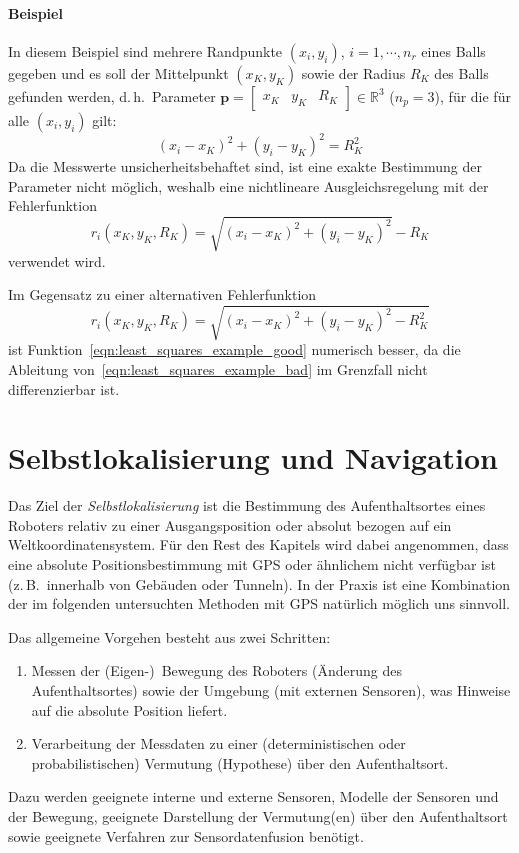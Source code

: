 \documentclass[a4paper, 11pt, accentcolor = tud3b]{tudreport}
\newcommand{\R}{\mathbb{R}}
\renewcommand{\vec}[1]{\boldsymbol{#1}}
\renewcommand{\dh}{d.\,h.~}
\newcommand{\zB}{z.\,B.~}
\begin{document}
				\paragraph{Beispiel}
					In diesem Beispiel sind mehrere Randpunkte \( (x_i, y_i) \), \( i = 1, \cdots, n_r \) eines Balls gegeben und es soll der Mittelpunkt \( (x_K, y_K) \) sowie der Radius \( R_K \) des Balls gefunden werden, \dh Parameter \( \vec{p} = \begin{bmatrix} x_K & y_K & R_K \end{bmatrix} \in \R^3 \) (\( n_p = 3 \)), für die für alle \( (x_i, y_i) \) gilt:
					\begin{equation*}
						(x_i - x_K)^2 + (y_i - y_K)^2 = R_K^2 \tag{Kreisgleichung}
					\end{equation*}
					Da die Messwerte unsicherheitsbehaftet sind, ist eine exakte Bestimmung der Parameter nicht möglich, weshalb eine nichtlineare Ausgleichsregelung mit der Fehlerfunktion
					\begin{equation}
						r_i(x_K, y_K, R_K) = \sqrt{(x_i - x_K)^2 + (y_i - y_K)^2} - R_K \label{eqn:least_squares_example_good}
					\end{equation}
					verwendet wird.
					
					Im Gegensatz zu einer alternativen Fehlerfunktion
					\begin{equation}
						r_i(x_K, y_K, R_K) = \sqrt{(x_i - x_K)^2 + (y_i - y_K)^2 - R_K^2} \label{eqn:least_squares_example_bad}
					\end{equation}
					ist Funktion~\ref{eqn:least_squares_example_good} numerisch besser, da die Ableitung von~\ref{eqn:least_squares_example_bad} im Grenzfall nicht differenzierbar ist.

		\section{Selbstlokalisierung und Navigation}
			Das Ziel der \emph{Selbstlokalisierung} ist die Bestimmung des Aufenthaltsortes eines Roboters relativ zu einer Ausgangsposition oder absolut bezogen auf ein Weltkoordinatensystem. Für den Rest des Kapitels wird dabei angenommen, dass eine absolute Positionsbestimmung mit GPS oder ähnlichem nicht verfügbar ist (\zB innerhalb von Gebäuden oder Tunneln). In der Praxis ist eine Kombination der im folgenden untersuchten Methoden mit GPS natürlich möglich uns sinnvoll.
			
			Das allgemeine Vorgehen besteht aus zwei Schritten:
			\begin{enumerate}
				\item Messen der (Eigen-)~Bewegung des Roboters (Änderung des Aufenthaltsortes) sowie der Umgebung (mit externen Sensoren), was Hinweise auf die absolute Position liefert.
				\item Verarbeitung der Messdaten zu einer (deterministischen oder probabilistischen) Vermutung (Hypothese) über den Aufenthaltsort.
			\end{enumerate}
			Dazu werden geeignete interne und externe Sensoren, Modelle der Sensoren und der Bewegung, geeignete Darstellung der Vermutung(en) über den Aufenthaltsort sowie geeignete Verfahren zur Sensordatenfusion benötigt.
			
\end{document}
